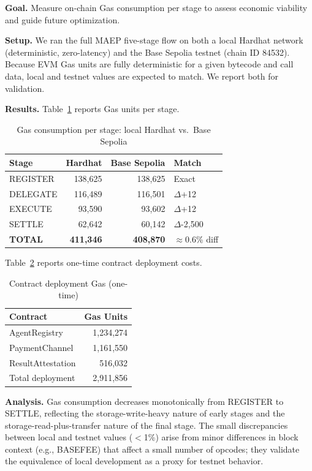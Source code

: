 \documentclass[conference]{IEEEtran}
\begin{document}
\textbf{Goal.}
Measure on-chain Gas consumption per stage to assess economic
viability and guide future optimization.

\textbf{Setup.}
We ran the full MAEP five-stage flow on both a local Hardhat network
(deterministic, zero-latency) and the Base Sepolia testnet (chain ID
84532).  Because EVM Gas units are fully deterministic for a given
bytecode and call data, local and testnet values are expected to
match.  We report both for validation.

\textbf{Results.}
Table~\ref{tab:gas} reports Gas units per stage.

\begin{table}[h]
\caption{Gas consumption per stage: local Hardhat vs.\ Base Sepolia}
\label{tab:gas}
\centering
\begin{tabular}{lrrl}
\toprule
\textbf{Stage} & \textbf{Hardhat} & \textbf{Base Sepolia} & \textbf{Match} \\
\midrule
REGISTER & 138,625 & 138,625 & Exact \\
DELEGATE & 116,489 & 116,501 & $\Delta$+12 \\
EXECUTE  & 93,590  & 93,602  & $\Delta$+12 \\
SETTLE   & 62,642  & 60,142  & $\Delta$-2,500 \\
\midrule
\textbf{TOTAL} & \textbf{411,346} & \textbf{408,870} & $\approx$0.6\% diff \\
\bottomrule
\end{tabular}
\end{table}

Table~\ref{tab:deploy_gas} reports one-time contract deployment costs.

\begin{table}[h]
\caption{Contract deployment Gas (one-time)}
\label{tab:deploy_gas}
\centering
\begin{tabular}{lr}
\toprule
\textbf{Contract} & \textbf{Gas Units} \\
\midrule
AgentRegistry    & 1,234,274 \\
PaymentChannel   & 1,161,550 \\
ResultAttestation & 516,032 \\
\midrule
Total deployment & 2,911,856 \\
\bottomrule
\end{tabular}
\end{table}

\textbf{Analysis.}
Gas consumption decreases monotonically from REGISTER to SETTLE,
reflecting the storage-write-heavy nature of early stages and the
storage-read-plus-transfer nature of the final stage.  The small
discrepancies between local and testnet values ($<$1\%) arise from
minor differences in block context (e.g., BASEFEE) that affect a
small number of opcodes; they validate the equivalence of local
development as a proxy for testnet behavior.
\end{document}
